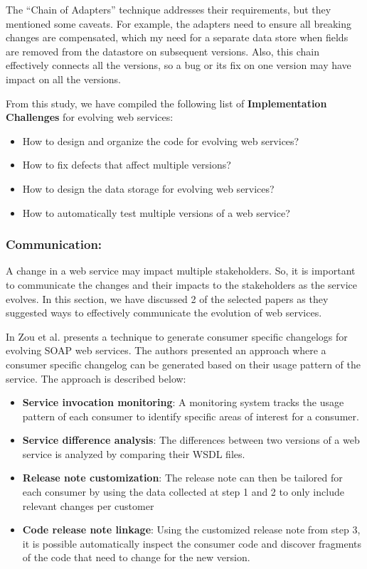 \documentclass[runningheads,a4paper]{llncs}
\begin{document}
The ``Chain of Adapters'' technique addresses their requirements, but they mentioned some caveats. For example, the adapters need to ensure all breaking changes are compensated, which my need for a separate data store when fields are removed from the datastore on subsequent versions. Also, this chain effectively connects all the versions, so a bug or its fix on one version may have impact on all the versions.

From this study, we have compiled the following list of \textbf{Implementation Challenges} for evolving web services:

\begin{itemize}
  \item How to design and organize the code for evolving web services?
  \item How to fix defects that affect multiple versions?
  \item How to design the data storage for evolving web services?
  \item How to automatically test multiple versions of a web service?
\end{itemize}

\subsubsection{Communication:}
A change in a web service may impact multiple stakeholders. So, it is important to communicate the changes and their impacts to the stakeholders as the service evolves. In this section, we have discussed 2 of the selected papers as they suggested ways to effectively communicate the evolution of web services.

In \cite{le2008synchronizing} Zou et al. presents a technique to generate consumer specific changelogs for evolving SOAP web services. The authors presented an approach where a consumer specific changelog can be generated based on their usage pattern of the service. The approach is described below:

\begin{itemize}
  \item \textbf{Service invocation monitoring}: A monitoring system tracks the usage pattern of each consumer to identify specific areas of interest for a consumer.
  \item \textbf{Service difference analysis}: The differences between two versions of a web service is analyzed by comparing their WSDL files.
  \item \textbf{Release note customization}: The release note can then be tailored for each consumer by using the data collected at step 1 and 2 to only include relevant changes per customer
  \item \textbf{Code release note linkage}: Using the customized release note from step 3, it is possible automatically inspect the consumer code and discover fragments of the code that need to change for the new version.
\end{itemize}
\end{document}
